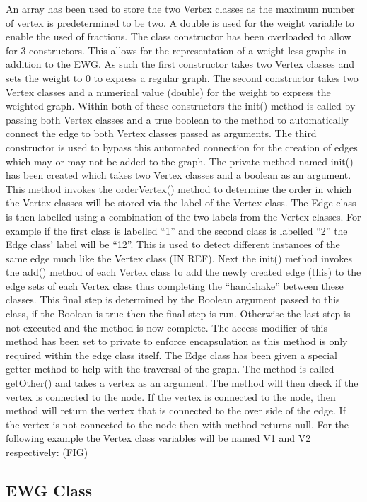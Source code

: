\documentclass{AISB2008}
\begin{document}
An array has been used to store the two Vertex classes as the maximum number of vertex is predetermined to be two. A double is used for the weight variable to enable the used of fractions. 
The class constructor has been overloaded to allow for 3 constructors. This allows for the representation of a weight-less graphs in addition to the EWG. As such the first constructor takes two Vertex classes and sets the weight to 0 to express a regular graph. The second constructor takes two Vertex classes and a numerical value (double) for the weight to express the weighted graph. Within both of these constructors the init()  method is called by passing both Vertex classes and a true boolean to the method to automatically connect the edge to both Vertex classes passed as arguments. The third constructor is used to bypass this automated connection for the creation of edges which may or may not be added to the graph.
The private method named init() has been created which takes two Vertex classes and a boolean as an argument. This method invokes the orderVertex() method to determine the order in which the Vertex classes will be stored via the label of the Vertex class. The Edge class is then labelled using a combination of the two labels from the Vertex classes. For example if the first class is labelled “1” and the second class is labelled “2” the Edge class’ label will be “12”. This is used to detect different instances of the same edge much like the Vertex class (IN REF). Next the init() method invokes the add() method of each Vertex class to add the newly created edge (this) to the edge sets of each Vertex class thus completing the “handshake” between these classes. This final step is determined by the Boolean argument passed to this class, if the Boolean is true then the final step is run. Otherwise the last step is not executed and the method is now complete. The access modifier of this method has been set to private to enforce encapsulation as this method is only required within the edge class itself.
The Edge class has been given a special getter method to help with the traversal of the graph. The method is called getOther() and takes a vertex as an argument. The method will then check if the vertex is connected to the node. If the vertex is connected to the node, then method will return the vertex that is connected to the over side of the edge. If the vertex is not connected to the node then with method returns null.
For the following example the Vertex class variables will be named V1 and V2 respectively:
(FIG)

\subsection{EWG Class}
\end{document}
